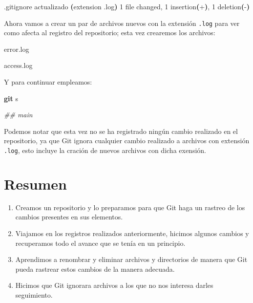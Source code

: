 \documentclass[
]{book}
\newenvironment{Shaded}{\begin{snugshade}}{\end{snugshade}}
\newcommand{\CommentTok}[1]{\textcolor[rgb]{0.56,0.35,0.01}{\textit{#1}}}
\newcommand{\ErrorTok}[1]{\textcolor[rgb]{0.64,0.00,0.00}{\textbf{#1}}}
\newcommand{\ExtensionTok}[1]{#1}
\newcommand{\FunctionTok}[1]{\textcolor[rgb]{0.13,0.29,0.53}{\textbf{#1}}}
\newcommand{\KeywordTok}[1]{\textcolor[rgb]{0.13,0.29,0.53}{\textbf{#1}}}
\newcommand{\NormalTok}[1]{#1}
\begin{document}
\begin{Shaded}
\begin{Highlighting}[]
\ExtensionTok{[main}\NormalTok{ c20b80d] .gitignore actualizado }\ErrorTok{(}\ExtensionTok{extension}\NormalTok{ .log}\KeywordTok{)}
 \ExtensionTok{1}\NormalTok{ file changed, 1 insertion}\ErrorTok{(}\ExtensionTok{+}\KeywordTok{)}\ExtensionTok{,}\NormalTok{ 1 deletion}\ErrorTok{(}\ExtensionTok{{-}}\KeywordTok{)}
\end{Highlighting}
\end{Shaded}

Ahora vamos a crear un par de archivos nuevos con la extensión \texttt{.log} para ver como afecta al registro del repositorio; esta vez crearemos los archivos:

\begin{Shaded}
\begin{Highlighting}[]
\ExtensionTok{error.log}
\end{Highlighting}
\end{Shaded}

\begin{Shaded}
\begin{Highlighting}[]
\ExtensionTok{access.log}
\end{Highlighting}
\end{Shaded}

Y para continuar empleamos:

\begin{Shaded}
\begin{Highlighting}[]
\FunctionTok{git}\NormalTok{ s}
\end{Highlighting}
\end{Shaded}

\begin{Shaded}
\begin{Highlighting}[]
\CommentTok{\#\# main}
\end{Highlighting}
\end{Shaded}

Podemos notar que esta vez no se ha registrado ningún cambio realizado en el repositorio, ya que Git ignora cualquier cambio realizado a archivos con extensión \texttt{.log}, esto incluye la cración de nuevos archivos con dicha exensión.

\section{Resumen}\label{resumen}

\begin{enumerate}
\def\labelenumi{\arabic{enumi}.}
\item
  Creamos un repositorio y lo preparamos para que Git haga un rastreo de los cambios presentes en sus elementos.
\item
  Viajamos en los registros realizados anteriormente, hicimos algunos cambios y recuperamos todo el avance que se tenía en un principio.
\item
  Aprendimos a renombrar y eliminar archivos y directorios de manera que Git pueda rastrear estos cambios de la manera adecuada.
\item
  Hicimos que Git ignorara archivos a los que no nos interesa darles seguimiento.
\end{enumerate}
\end{document}
